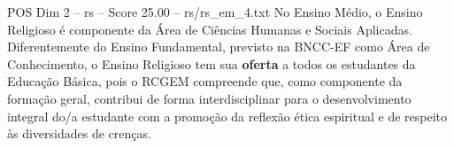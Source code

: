 \begin{textsample}{POS Dim 2 – rs – Score 25.00 – rs/rs\_em\_4.txt}
No Ensino Médio, o Ensino Religioso é componente da Área de Ciências Humanas e Sociais Aplicadas.
Diferentemente do Ensino Fundamental, previsto na BNCC-EF como Área de Conhecimento, o Ensino Religioso tem sua \textbf{oferta} a todos os estudantes da Educação Básica, pois o RCGEM compreende que, como componente da formação geral, contribui de forma interdisciplinar para o desenvolvimento integral do/a estudante com a promoção da reflexão ética espiritual e de respeito às diversidades de crenças.

\end{textsample}
